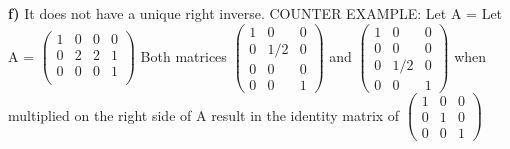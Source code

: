 \documentclass[12pt]{article}
\begin{document}
\textbf{f)}
\newline
It does not have a unique right inverse.
\newline
COUNTER EXAMPLE: Let A = Let A = $\left(\begin{array}{cccc} 1 & 0 & 0 & 0 \\ 0 & 2 & 2 & 1\\ 0 & 0 & 0 & 1 \\ \end{array}\right)$
Both matrices $\left(\begin{array}{ccc} 1 & 0 & 0   \\ 0 & 1/2 & 0  \\ 0 &  0 & 0 \\ 0 & 0 & 1 \end{array}\right)$ and  $\left(\begin{array}{ccc} 1 & 0 & 0   \\ 0 & 0 & 0  \\ 0 &  1/2 & 0 \\ 0 & 0 & 1 \end{array}\right)$ when multiplied on the right side of A 
\newline
result in the identity matrix of  
$\left(\begin{array}{cccc} 1 & 0 & 0    \\ 0 & 1 & 0 \\ 0 & 0 & 1 \end{array}\right)$
\newline
\end{document}
